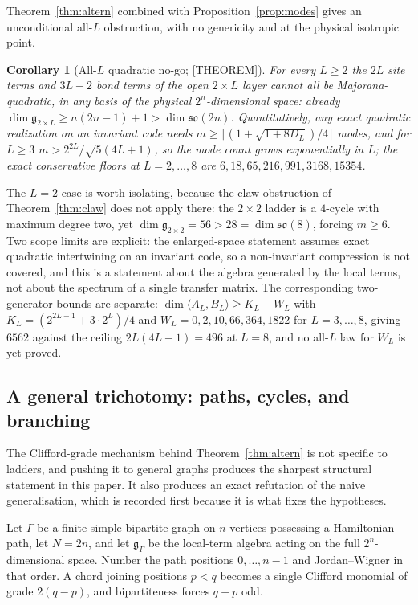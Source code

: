 \documentclass[11pt]{article}
\newtheorem{corollary}[theorem]{Corollary}
\theoremstyle{definition}
\newcommand{\alg}{\mathfrak{g}}
\begin{document}
Theorem~\ref{thm:altern} combined with Proposition~\ref{prop:modes} gives an unconditional all-$L$
obstruction, with no genericity and at the physical isotropic point.

\begin{corollary}[All-$L$ quadratic no-go; {[THEOREM]}]\label{cor:alllquad}
For every $L\ge2$ the $2L$ site terms and $3L-2$ bond terms of the open $2\times L$ layer cannot all
be Majorana-quadratic, in any basis of the physical $2^{n}$-dimensional space: already
$\dim\alg_{2\times L}\ge n(2n-1)+1>\dim\mathfrak{so}(2n)$. Quantitatively, any exact quadratic
realization on an invariant code needs
$m\ge\lceil(1+\sqrt{1+8D_L})/4\rceil$ modes, and for $L\ge3$
$m>2^{2L}/\sqrt{5(4L+1)}$, so the mode count grows exponentially in $L$; the exact conservative
floors at $L=2,\dots,8$ are $6,18,65,216,991,3168,15354$.
\end{corollary}

The $L=2$ case is worth isolating, because the claw obstruction of Theorem~\ref{thm:claw} does not
apply there: the $2\times2$ ladder is a $4$-cycle with maximum degree two, yet
$\dim\alg_{2\times2}=56>28=\dim\mathfrak{so}(8)$, forcing $m\ge6$. Two scope limits are explicit: the
enlarged-space statement assumes exact quadratic intertwining on an invariant code, so a
non-invariant compression is not covered, and this is a statement about the algebra generated by the
local terms, not about the spectrum of a single transfer matrix. The corresponding two-generator
bounds are separate: $\dim\langle A_L,B_L\rangle\ge K_L-W_L$ with $K_L=(2^{2L-1}+3\cdot2^{L})/4$ and
$W_L=0,2,10,66,364,1822$ for $L=3,\dots,8$, giving $6562$ against the ceiling $2L(4L-1)=496$ at
$L=8$, and no all-$L$ law for $W_L$ is yet proved.

\subsection{A general trichotomy: paths, cycles, and branching}\label{sec:trichotomy}
The Clifford-grade mechanism behind Theorem~\ref{thm:altern} is not specific to ladders, and pushing
it to general graphs produces the sharpest structural statement in this paper. It also produces an
exact refutation of the naive generalisation, which is recorded first because it is what fixes the
hypotheses.

Let $\Gamma$ be a finite simple bipartite graph on $n$ vertices possessing a Hamiltonian path, let
$N=2n$, and let $\alg_\Gamma$ be the local-term algebra acting on the full $2^n$-dimensional space.
Number the path positions $0,\dots,n-1$ and Jordan--Wigner in that order. A chord joining positions
$p<q$ becomes a single Clifford monomial of grade $2(q-p)$, and bipartiteness forces $q-p$ odd.
\end{document}
